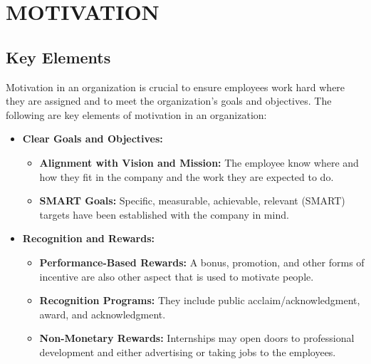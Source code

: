 \chapter{MOTIVATION}

\section{Key Elements}
Motivation in an organization is crucial to ensure employees work hard where they are assigned and to meet the organization’s goals and objectives. The following are key elements of motivation in an organization:
\begin{itemize}

\item \textbf{Clear Goals and Objectives:}
\begin{itemize}
    \item \textbf{Alignment with Vision and Mission:} The employee know where and how they fit in the company and the work they are expected to do.
    \item \textbf{SMART Goals:} Specific, measurable, achievable, relevant (SMART) targets have been established with the company in mind. 
\end{itemize}

\item \textbf{Recognition and Rewards:}
\begin{itemize}
    \item \textbf{Performance-Based Rewards:} A bonus, promotion, and other forms of incentive are also other aspect that is used to motivate people. 
    \item \textbf{Recognition Programs:} They include public acclaim/acknowledgment, award, and acknowledgment.
    \item \textbf{Non-Monetary Rewards:} Internships may open doors to professional development and either advertising or taking jobs to the employees. 
\end{itemize}


\end{itemize}

